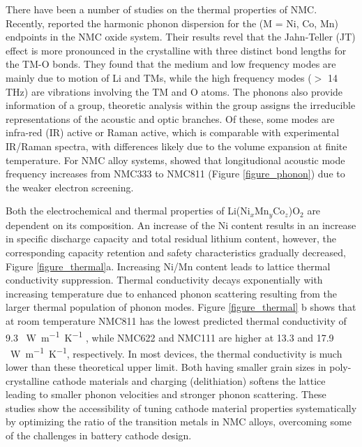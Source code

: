 \documentclass[aps,prb,twocolumn,superscriptaddress,reprint]{revtex4-1}
\begin{document}
There have been a number of studies on the thermal properties of NMC. 
Recently, \citeauthor{yang2020chemical} reported the harmonic phonon dispersion for the  (M = Ni, Co, Mn) endpoints in the NMC oxide system. \cite{yang2020chemical}
Their results revel that the Jahn-Teller (JT) effect is more pronounced in the crystalline  with three distinct bond lengths for the TM-O bonds. They found that the medium and low frequency modes are mainly due to motion of Li and TMs, while the high frequency modes ($>$ 14 THz) are vibrations involving the TM and O atoms.
The phonons also provide information of a group, theoretic analysis within the group assigns the irreducible representations of the acoustic and optic branches. Of these, some modes are infra-red (IR) active or Raman active, which is comparable with experimental IR/Raman spectra, with differences likely due to the volume expansion at finite temperature. \cite{yang2019highly} 
For NMC alloy systems, \citeauthor{sun_electronic_2017} showed that longitudional acoustic mode frequency increases from NMC333 to NMC811 (Figure \ref{figure_phonon}) due to the weaker electron screening.\cite{sun_electronic_2017}

Both the electrochemical and thermal properties of Li(Ni$_x$Mn$_y$Co$_z$)O$_2$ are dependent on its composition. 
An increase of the Ni content results in an increase in speciﬁc discharge capacity and total residual lithium content, however, the corresponding capacity retention and safety characteristics gradually decreased, Figure \ref{figure_thermal}a. \cite{noh2013comparison} 
Increasing Ni/Mn content leads to lattice thermal conductivity suppression.\cite{yang2020chemical}
Thermal conductivity decays exponentially with increasing temperature due to enhanced phonon scattering resulting from the larger thermal population of phonon modes.
Figure \ref{figure_thermal} b shows that at room temperature NMC811 has the lowest predicted thermal conductivity of 9.3 \SI{}{W.m^{-1}.K^{-1}} , while NMC622 and NMC111 are higher at 13.3 and 17.9 \SI{}{W.m^{-1}.K^{-1}}, respectively.
In most devices, the thermal conductivity is much lower than these theoretical upper limit.\cite{takahata2002thermal,chen2006thermal}
Both having smaller grain sizes in poly-crystalline cathode materials and charging (delithiation) softens the lattice leading to smaller phonon velocities and stronger phonon scattering. \cite{feng2020quantum,xia2020high}
These studies show the accessibility of tuning cathode material properties systematically by optimizing the ratio of the transition metals in NMC alloys, overcoming some of the challenges in battery cathode design.
\end{document}
